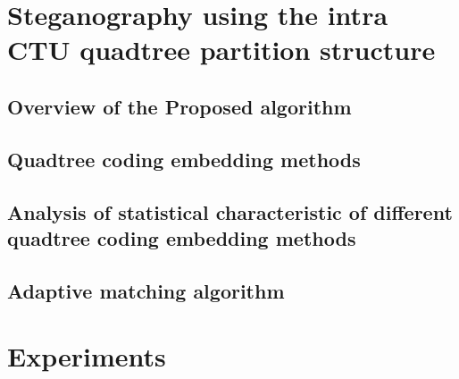 \documentclass[journal,sort]{IEEEtran}
\begin{document}
\section{Steganography using the intra CTU quadtree partition structure}


\subsection{Overview of the Proposed algorithm}

\subsection{Quadtree coding embedding methods}

\subsection{Analysis of statistical characteristic of different quadtree coding embedding methods}

\subsection{Adaptive matching algorithm}


\section{Experiments}




	
	
	
	
	
	
	
\end{document}
